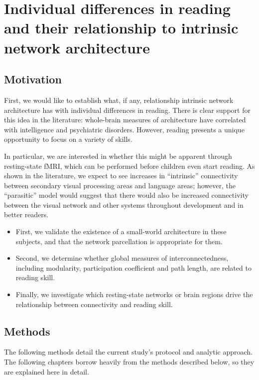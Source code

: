 \chapter{Individual differences in reading and their relationship to intrinsic network architecture}

\section{Motivation}

First, we would like to establish what, if any, relationship intrinsic network architecture has with individual differences in reading. There is clear support for this idea in the literature: whole-brain measures of architecture have correlated with intelligence and psychiatric disorders. However, reading presents a unique opportunity to focus on a variety of skills. 

In particular, we are interested in whether this might be apparent through resting-state fMRI, which can be performed before children even start reading. As shown in the literature, we expect to see increases in ``intrinsic'' connectivity between secondary visual processing areas and language areas; however, the ``parasitic'' model would suggest that there would also be increased connectivity between the visual network and other systems throughout development and in better readers. 

\begin{itemize}
    \item First, we validate the existence of a small-world architecture in these subjects, and that the network parcellation is appropriate for them.
    \item Second, we determine whether global measures of interconnectedness, including modularity, participation coefficient and path length, are related to reading skill.
    \item Finally, we investigate which resting-state networks or brain regions drive the relationship between connectivity and reading skill.
\end{itemize}


\section{Methods}

The following methods detail the current study's protocol and analytic approach. The following chapters borrow heavily from the methods described below, so they are explained here in detail. 

